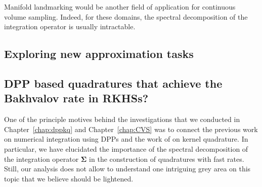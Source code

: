 \documentclass[twoside,11pt]{book}
\numberwithin{theorem}{chapter}
\numberwithin{definition}{chapter}
\numberwithin{proposition}{chapter}
\numberwithin{corollary}{chapter}
\numberwithin{example}{chapter}
\numberwithin{lemma}{chapter}
\numberwithin{assumption}{chapter}
\numberwithin{equation}{chapter}
\numberwithin{figure}{chapter}
\begin{document}
Manifold landmarking \citep*{GaKoDa19}\citep*{EhGrCh19} would be another field of application for continuous volume sampling. Indeed, for these domains, the spectral decomposition of  the integration operator is usually intractable.










\subsection{Exploring new approximation tasks}

\subsection{DPP based quadratures that achieve the Bakhvalov rate in RKHSs?}\label{sec:bakhvalov}

One of the principle motives behind the investigations that we conducted in Chapter~\ref{chap:dppkq} and Chapter~\ref{chap:CVS} was to connect the previous work on numerical integration using DPPs
\citep{BaHa16,CoMaAm20} and the work of \citep{Bac17} on kernel quadrature. In particular, we have elucidated the importance of the spectral decomposition of the integration operator $\bm{\Sigma}$ in the construction of quadratures with fast rates. Still, our analysis does not allow to understand one intriguing grey area
on this topic that we believe should be lightened.
\end{document}
